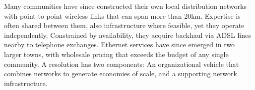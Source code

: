 

Many communities have since constructed their own local distribution
networks with point-to-point wireless links that can span more than
20km. Expertise is often shared between them, also infrastructure
where feasible, yet they operate independently. Constrained by
availability, they acquire backhaul via ADSL lines nearby to telephone
exchanges. Ethernet services have since emerged in two larger towns,
with wholesale pricing that exceeds the budget of any single
community. A resolution has two components: An organizational vehicle
that combines networks to generate economies of scale, and a
supporting network infrastructure.



